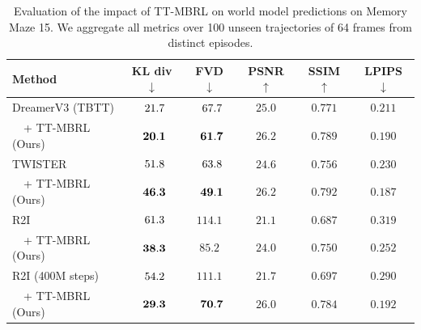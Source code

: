 \begin{table}[ht]
    \caption{Evaluation of the impact of TT-MBRL on world model predictions on Memory Maze 15. We aggregate all metrics over 100 unseen trajectories of 64 frames from distinct episodes.}
    \centering
    \setlength{\tabcolsep}{11pt}
    \hfill \break
    \begin{tabular}{lccccc}
    \toprule
    \textbf{Method} & \textbf{KL div $\downarrow$} & \textbf{FVD $\downarrow$} & \textbf{PSNR $\uparrow$} & \textbf{SSIM $\uparrow$} & \textbf{LPIPS $\downarrow$} \\
    \midrule
    DreamerV3 (TBTT) & $\hphantom{0}21.7$ & $\hphantom{0}67.7$ & $25.0$ & $0.771$ & $0.211$ \\
    ~~+ TT-MBRL (Ours) & $\hphantom{0}\mathbf{20.1}$ & $\hphantom{0}\mathbf{61.7}$ & $\mathbf{26.2}$ & $\mathbf{0.789}$ & $\mathbf{0.190}$ \\
    \midrule
    TWISTER & $\hphantom{0}51.8$ & $\hphantom{0}63.8$ & $24.6$ & $0.756$ & $0.230$ \\
    ~~+ TT-MBRL (Ours) & $\mathbf{\hphantom{0}46.3}$ & $\mathbf{\hphantom{0}49.1}$ & $\mathbf{26.2}$ & $\mathbf{0.792}$ & $\mathbf{0.187}$ \\
    \midrule
    R2I & $\hphantom{0}61.3$ & $114.1$ & $21.1$ & $0.687$ & $0.319$ \\
    ~~+ TT-MBRL (Ours) & $\mathbf{\hphantom{0}38.3}$ & $\mathbf{85.2}$ & $\mathbf{24.0}$ & $\mathbf{0.750}$ & $\mathbf{0.252}$ \\
    \midrule
    R2I (400M steps) & $\hphantom{0}54.2$ & $111.1$ & $21.7$ & $0.697$ & $0.290$ \\
    ~~+ TT-MBRL (Ours)& $\mathbf{\hphantom{0}29.3}$ & $\mathbf{\hphantom{0}70.7}$ & $\mathbf{26.0}$ & $\mathbf{0.784}$ & $\mathbf{0.192}$ \\
    \bottomrule
    \end{tabular}
    \label{table:metrics_3d}
\end{table}